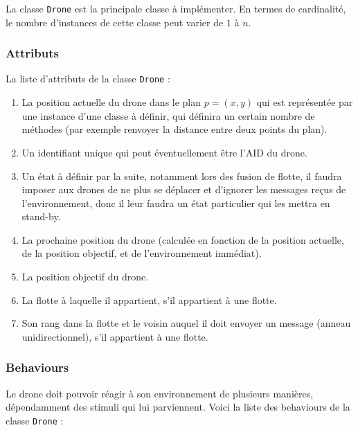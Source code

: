 \documentclass[11pt]{report}
\begin{document}
La classe \verb|Drone| est la principale classe à implémenter. En termes de cardinalité, le nombre d'instances de cette classe peut varier de $1$ à $n$.

\subsubsection{Attributs}

La liste d'attributs de la classe \verb|Drone| :

\begin{enumerate}
\item La position actuelle du drone dans le plan $p = (x, y)$ qui est représentée par une instance d'une classe à définir, qui définira un certain nombre de méthodes (par exemple renvoyer la distance entre deux points du plan).

\item Un identifiant unique qui peut éventuellement être l'AID du drone.

\item Un état à définir par la suite, notamment lors des fusion de flotte, il faudra imposer aux drones de ne plus se déplacer et d'ignorer les messages reçus de l'environnement, donc il leur faudra un état particulier qui les mettra en stand-by.

\item La prochaine position du drone (calculée en fonction de la position actuelle, de la position objectif, et de l'environnement immédiat).

\item La position objectif du drone.

\item La flotte à laquelle il appartient, s'il appartient à une flotte.

\item Son rang dans la flotte et le voisin auquel il doit envoyer un message (anneau unidirectionnel), s'il appartient à une flotte.
\end{enumerate}

\subsubsection{Behaviours} 

Le drone doit pouvoir réagir à son environnement de plusieurs manières, dépendamment des stimuli qui lui parviennent. Voici la liste des behaviours de la classe \verb|Drone| :
\end{document}
